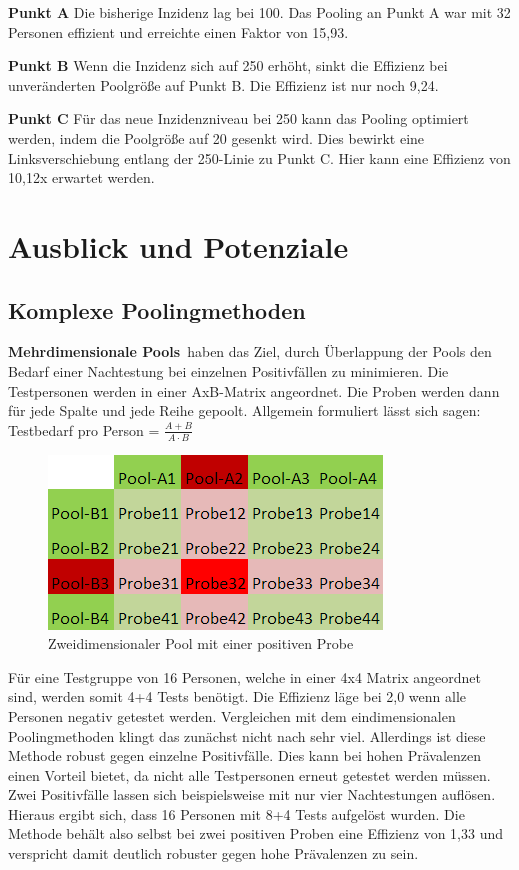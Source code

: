 \textbf{Punkt A}\newline
Die bisherige Inzidenz lag bei 100.
Das Pooling an Punkt A war mit 32 Personen effizient und erreichte einen Faktor von 15,93.

\textbf{Punkt B}\newline
Wenn die Inzidenz sich auf 250 erhöht, sinkt die Effizienz bei unveränderten Poolgröße auf Punkt B. Die Effizienz ist nur noch 9,24.

\textbf{Punkt C}\newline
Für das neue Inzidenzniveau bei 250 kann das Pooling optimiert werden, indem die Poolgröße auf 20 gesenkt wird.
Dies bewirkt eine Linksverschiebung entlang der 250-Linie zu Punkt C.
Hier kann eine Effizienz von 10,12x erwartet werden.


\cleardoublepage
\chapter{Ausblick und Potenziale}
\section{Komplexe Poolingmethoden}
\textbf{Mehrdimensionale Pools}\ haben das Ziel, durch Überlappung der Pools den Bedarf einer Nachtestung bei einzelnen Positivfällen zu minimieren.
Die Testpersonen werden in einer AxB-Matrix angeordnet.
Die Proben werden dann für jede Spalte und jede Reihe gepoolt.
Allgemein formuliert lässt sich sagen:
Testbedarf pro Person =
$\frac{A+B}{A\cdot B}$

\begin{figure}[h]
	\centering
	\includegraphics[width=.4\textwidth]{img/2d_Pool_1Positiv}
	\caption{Zweidimensionaler Pool mit einer positiven Probe\footnotemark}
\end{figure}
Für eine Testgruppe von 16 Personen, welche in einer 4x4 Matrix angeordnet sind, werden somit 4+4 Tests benötigt.
Die Effizienz läge bei 2,0 wenn alle Personen negativ getestet werden.
Vergleichen mit dem eindimensionalen Poolingmethoden klingt das zunächst nicht nach sehr viel.
Allerdings ist diese Methode robust gegen einzelne Positivfälle.
Dies kann bei hohen Prävalenzen einen Vorteil bietet, da nicht alle Testpersonen erneut getestet werden müssen.
Zwei Positivfälle lassen sich beispielsweise mit nur vier Nachtestungen auflösen.
Hieraus ergibt sich, dass 16 Personen mit 8+4 Tests aufgelöst wurden.
Die Methode behält also selbst bei zwei positiven Proben eine Effizienz von 1,33 und verspricht damit deutlich robuster gegen hohe Prävalenzen zu sein.

